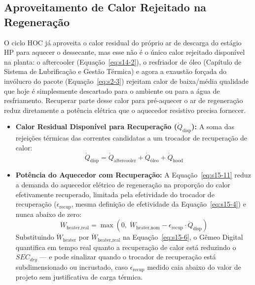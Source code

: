 \documentclass[12pt,a4paper]{article}
\numberwithin{equation}{section}
\numberwithin{table}{section}
\numberwithin{figure}{section}
\begin{document}
		\subsection{\textbf{Aproveitamento de Calor Rejeitado na Regeneração}}
		O ciclo HOC já aproveita o calor residual do próprio ar de descarga do estágio HP para aquecer o dessecante, mas esse não é o único calor rejeitado disponível na planta: o aftercooler (Equação~\eqref{eq:s14-2}), o resfriador de óleo (Capítulo de Sistema de Lubrificação e Gestão Térmica) e agora a exaustão forçada do invólucro do pacote (Equação~\eqref{eq:s2-3}) rejeitam calor de baixa/média qualidade que hoje é simplesmente descartado para o ambiente ou para a água de resfriamento. Recuperar parte desse calor para pré-aquecer o ar de regeneração reduz diretamente a potência elétrica que o aquecedor resistivo precisa fornecer.
		\begin{itemize}
			\item \textbf{Calor Residual Disponível para Recuperação ($\dot{Q}_{\text{disp}}$):} A soma das rejeições térmicas das correntes candidatas a um trocador de recuperação de calor:
			\begin{equation}\label{eq:s15-10}
\dot{Q}_{\text{disp}} = \dot{Q}_{\text{aftercooler}} + \dot{Q}_{\text{óleo}} + \dot{Q}_{\text{hood}}
\end{equation}
			\item \textbf{Potência do Aquecedor com Recuperação:} A Equação~\eqref{eq:s15-11} reduz a demanda do aquecedor elétrico de regeneração na proporção do calor efetivamente recuperado, limitada pela efetividade do trocador de recuperação ($\epsilon_{\text{recup}}$, mesma definição de efetividade da Equação~\eqref{eq:s15-4}) e nunca abaixo de zero:
			\begin{equation}\label{eq:s15-11}
\dot{W}_{\text{heater,real}} = \max\left(0,\; \dot{W}_{\text{heater,nom}} - \epsilon_{\text{recup}} \cdot \dot{Q}_{\text{disp}}\right)
\end{equation}
			Substituindo $\dot{W}_{\text{heater}}$ por $\dot{W}_{\text{heater,real}}$ na Equação~\eqref{eq:s15-6}, o Gêmeo Digital quantifica em tempo real quanto a recuperação de calor está reduzindo o $SEC_{dry}$ — e pode sinalizar quando o trocador de recuperação está subdimensionado ou incrustado, caso $\epsilon_{\text{recup}}$ medido caia abaixo do valor de projeto sem justificativa de carga térmica.
		\end{itemize}
\end{document}
